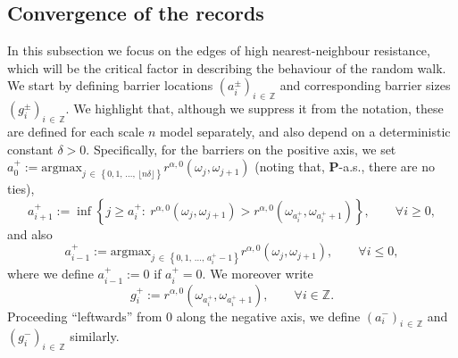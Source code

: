 \documentclass[10pt]{amsart}
\theoremstyle{definition}\newtheorem{defi}[theo]{Definition}\newtheorem{rema}[theo]{Remark}\newtheorem{exam}[theo]{Example}\newtheorem{exem}[theo]{Example}\newtheorem{nota}[theo]{Notation}
\newcommand{\Z}{\mathbb Z}
\newcommand{\bfP}{\mathbf{P}}
\newcommand{\argmax}{\mathrm{argmax}}
\let\oldforall\forall
\renewcommand*{\forall}{\mathrel{\oldforall}}
\begin{document}
\subsection{Convergence of the records}\label{21}
In this subsection we focus on the edges of high nearest-neighbour resistance, which will be the critical factor in describing the behaviour of the random walk. We start by defining barrier locations $(a_i^\pm)_{i\,\in\,\Z}$ and corresponding barrier sizes $(g_i^\pm)_{i\,\in\,\Z}$. We highlight that, although we suppress it from the notation, these are defined for each scale $n$ model separately, and also depend on a deterministic constant $\delta>0$. Specifically, for the barriers on the positive axis, we set $a_0^+:=\argmax_{j\,\in\,\left\{0,1,\,\dots,\,\lfloor n\delta\rfloor\right\}}r^{\alpha,0}(\omega_j,\omega_{j+1})$ (noting that, $\bfP$-a.s., there are no ties),
\begin{equation}\label{adef}
a_{i+1}^+:=\inf\left\{j\geq a_{i}^+:\:r^{\alpha,0}\left(\omega_j,\omega_{j+1}\right)>r^{\alpha,0}\left(\omega_{a_i^+},\omega_{a_{i}^++1}\right)\right\},\qquad \forall i\geq 0,
\end{equation}
and also
\[
a_{i-1}^+:=\argmax_{j\,\in\,\left\{0,1,\,\dots,\,a_{i}^+-1\right\}}r^{\alpha,0}\left(\omega_j,\omega_{j+1}\right),\qquad \forall i\leq 0,
\]
where we define $a_{i-1}^+:=0$ if $a_i^{+}=0$. We moreover write
\begin{equation}\label{gdef}
g_i^+:=r^{\alpha,0}\left(\omega_{a_i^+},\omega_{a_{i}^++1}\right),\qquad \forall i\in\Z.
\end{equation}
Proceeding ``leftwards'' from 0 along the negative axis, we define $(a_i^-)_{i\,\in\,\Z}$ and $(g_i^-)_{i\,\in\,\Z}$ similarly.
\end{document}
